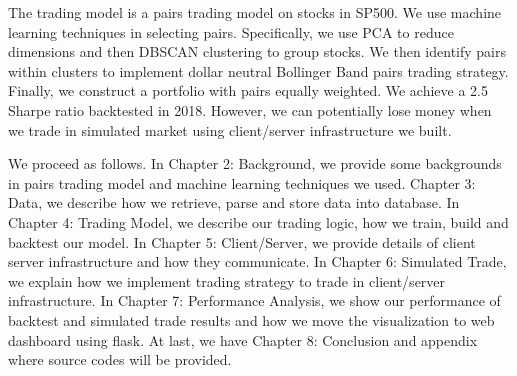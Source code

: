 %
The trading model is a pairs trading model on stocks in SP500. We use machine learning techniques in selecting pairs. Specifically, we use PCA to reduce dimensions and then DBSCAN clustering to group stocks. We then identify pairs within clusters to implement dollar neutral Bollinger Band pairs trading strategy. Finally, we construct a portfolio with pairs equally weighted. We achieve a 2.5 Sharpe ratio backtested in 2018. However, we can potentially lose money when we trade in simulated market using client/server infrastructure we built.

%
We proceed as follows. In Chapter 2: Background, we provide some backgrounds in pairs trading model and machine learning techniques we used. Chapter 3: Data, we describe how we retrieve, parse and store data into database. In Chapter 4: Trading Model, we describe our trading logic, how we train, build and backtest our model. In Chapter 5: Client/Server, we provide details of client server infrastructure and how they communicate. In Chapter 6: Simulated Trade, we explain how we implement trading strategy to trade in client/server infrastructure. In Chapter 7: Performance Analysis, we show our performance of backtest and simulated trade results and how we move the visualization to web dashboard using flask. At last, we have Chapter 8: Conclusion and appendix where source codes will be provided.